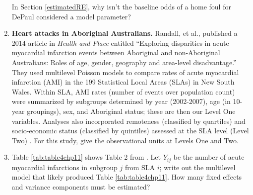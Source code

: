 \documentclass[
]{krantz}
\begin{document}
\begin{enumerate}
  In Section \ref{estimatedRE}, why isn't the baseline odds of a home foul for DePaul considered a model parameter?
\item
  \textbf{Heart attacks in Aboriginal Australians.} Randall, et al., published a 2014 article in \emph{Health and Place} entitled ``Exploring disparities in acute myocardial infarction events between Aboriginal and non-Aboriginal Australians: Roles of age, gender, geography and area-level disadvantage.'' They used multilevel Poisson models to compare rates of acute myocardial infarction (AMI) in the 199 Statistical Local Areas (SLAs) in New South Wales. Within SLA, AMI rates (number of events over population count) were summarized by subgroups determined by year (2002-2007), age (in 10-year groupings), sex, and Aboriginal status; these are then our Level One variables. Analyses also incorporated remoteness (classified by quartiles) and socio-economic status (classified by quintiles) assessed at the SLA level (Level Two) \citep{Randall2014}. For this study, give the observational units at Levels One and Two.
\item
  Table \ref{tab:table4chp11} shows Table 2 from \citet{Randall2014}. Let \(Y_{ij}\) be the number of acute myocardial infarctions in subgroup \(j\) from SLA \(i\); write out the multilevel model that likely produced Table \ref{tab:table4chp11}. How many fixed effects and variance components must be estimated?
\end{enumerate}
\end{document}
